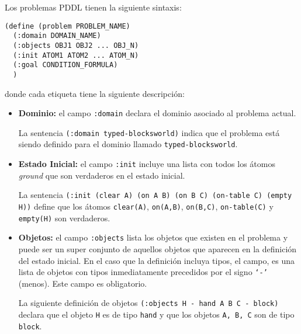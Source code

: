 Los problemas PDDL tienen la siguiente sintaxis: %

 \begin{verbatim} 
(define (problem PROBLEM_NAME)
  (:domain DOMAIN_NAME)
  (:objects OBJ1 OBJ2 ... OBJ_N)
  (:init ATOM1 ATOM2 ... ATOM_N)
  (:goal CONDITION_FORMULA)
  )
 \end{verbatim}
donde cada etiqueta tiene la siguiente descripci\'on:

\begin{itemize}

\item {\bf Dominio:} el campo \texttt{:domain} declara el dominio 
asociado al problema actual.

\begin{ejemplo}%

La sentencia \texttt{(:domain typed-blocksworld)} indica que el problema 
est\'a siendo definido para el dominio llamado \texttt{typed-blocksworld}.

\end{ejemplo}

\item {\bf Estado Inicial:} el campo \texttt{:init} incluye una lista con 
todos los \'atomos \emph{ground} que son verdaderos en el estado inicial.

\begin{ejemplo}%

La sentencia \texttt{(:init (clear A) (on A B) (on B C) (on-table C) (empty H))} 
define que los \'atomos \texttt{clear(A)}, 
\texttt{on(A,B)}, \texttt{on(B,C)}, \texttt{on-table(C)} y \texttt{empty(H)} son verdaderos.

\end{ejemplo}
 
\item {\bf Objetos:} el campo \texttt{:objects} lista los 
objetos que existen en el problema y 
puede ser un super conjunto de aquellos objetos 
que aparecen en la definici\'on del estado inicial. 
En el caso que la definici\'on incluya tipos, el 
campo, es una lista de objetos con tipos inmediatamente 
precedidos por el signo \texttt{`-'} (menos). Este campo es obligatorio. 

\begin{ejemplo}%

La siguiente definici\'on de objetos \texttt{(:objects H - hand A B C - block)} 
declara que el objeto \texttt{H} es de tipo \texttt{hand} y 
que los objetos \texttt{A, B, C} son de tipo \texttt{block}.


\end{ejemplo}
\end{itemize}
